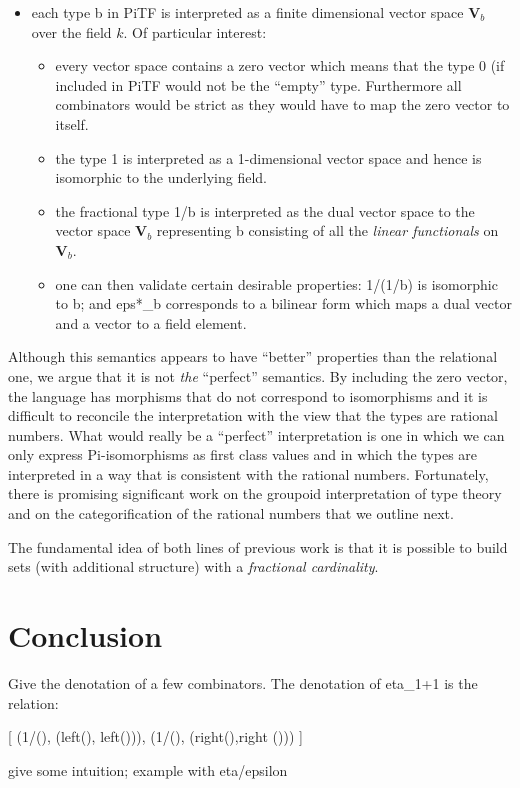 \documentclass{llncs}
\begin{document}
\begin{itemize}
\item each type {{b}} in {{PiTF}} is interpreted as a finite dimensional
  vector space $\mathbf{V}_b$ over the field $k$. Of particular
  interest:
  \begin{itemize}
  \item every vector space contains a zero vector which means that the type
    {{0}} (if included in {{PiTF}} would not be the ``empty'' type.
    Furthermore all combinators would be
    strict as they would have to map the zero vector to itself. 
  \item the type {{1}} is interpreted as a 1-dimensional vector space and hence
    is isomorphic to the underlying field.
  \item the fractional type {{1/b}} is interpreted as the dual vector space
    to the vector space $\mathbf{V}_b$ representing {{b}} consisting of all
    the \emph{linear functionals} on $\mathbf{V}_b$.
  \item one can then validate certain desirable properties: {{1/(1/b)}} is
    isomorphic to {{b}}; and {{eps*_b}} corresponds to a bilinear form which
    maps a dual vector and a vector to a field element.
  \end{itemize}
\end{itemize}

Although this semantics appears to have ``better'' properties than the
relational one, we argue that it is not \emph{the} ``perfect'' semantics. By
including the zero vector, the language has
morphisms that do not correspond to isomorphisms and it is difficult to
reconcile the interpretation with the view that the types are rational
numbers. What would really be a ``perfect'' interpretation is one in which we
can only express {{Pi}}-isomorphisms as first class values and in which the
types are interpreted in a way that is consistent with the rational
numbers. Fortunately, there is promising significant work on the groupoid
interpretation of type theory and on the categorification of the rational
numbers that we outline next.

The fundamental idea of both lines of previous work is that it is possible to
build sets (with additional structure) with a \emph{fractional cardinality}.



\section{Conclusion}

Give the denotation of a few combinators. The denotation of {{eta_{1+1} }} is
the relation:

{{ {[ (1/(), (left(), left())), (1/(), (right(),right ())) ]} }}

give some intuition; example with eta/epsilon



 

\end{document}
